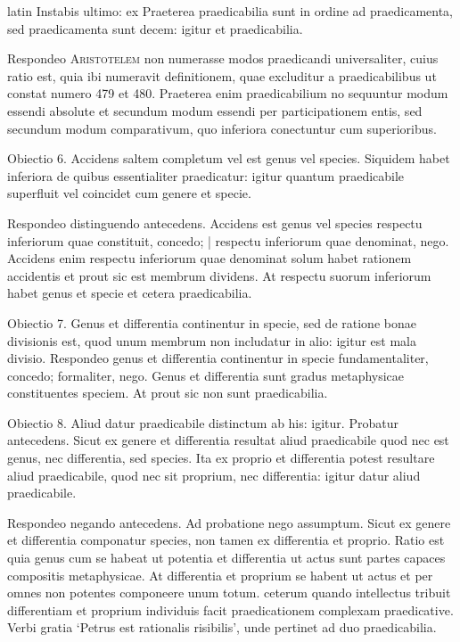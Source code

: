 \begin{otherlanguage*}{latin}
\pstart
Instabis ultimo:
ex  Praeterea praedicabilia sunt in ordine ad praedicamenta, sed praedicamenta sunt decem:
igitur et praedicabilia. 
\pend

\pstart
Respondeo \textsc{Aristotelem} non numerasse modos praedicandi universaliter, cuius ratio est, quia ibi numeravit definitionem, quae excluditur a praedicabilibus ut constat numero 479 et 480. Praeterea enim praedicabilium no sequuntur modum essendi absolute et secundum modum essendi per participationem entis, sed secundum modum comparativum, quo inferiora conectuntur cum superioribus. 
\pend

\pstart
Obiectio 6. Accidens saltem completum vel est genus vel species. Siquidem habet inferiora de quibus essentialiter praedicatur:
igitur quantum praedicabile superfluit vel coincidet cum genere et specie. 
\pend

\pstart
Respondeo distinguendo antecedens. Accidens est genus vel species respectu inferiorum quae constituit, concedo; \textnormal{|} respectu inferiorum quae denominat, nego. Accidens enim respectu inferiorum quae denominat solum habet rationem accidentis et prout sic est membrum dividens. At respectu suorum inferiorum habet genus et specie et cetera praedicabilia. 
\pend

\pstart
Obiectio 7. Genus et differentia continentur in specie, sed de ratione bonae divisionis est, quod unum membrum non includatur in alio:
igitur est mala divisio. Respondeo genus et differentia continentur in specie fundamentaliter, concedo; formaliter, nego. Genus et differentia sunt gradus metaphysicae constituentes speciem. At prout sic non sunt praedicabilia. 
\pend

\pstart
Obiectio 8. Aliud datur praedicabile distinctum ab his:
igitur. Probatur antecedens. Sicut ex genere et differentia resultat aliud praedicabile quod nec est genus, nec differentia, sed species. Ita ex proprio et differentia potest resultare aliud praedicabile, quod nec sit proprium, nec differentia:
igitur datur aliud praedicabile. 
\pend

\pstart
Respondeo negando antecedens. Ad probatione nego assumptum. Sicut ex genere et differentia componatur species, non tamen ex differentia et proprio. Ratio est quia genus cum se habeat ut potentia et differentia ut actus sunt partes capaces compositis metaphysicae. At differentia et proprium se habent ut actus et per omnes non potentes componeere unum totum. ceterum quando intellectus tribuit differentiam et proprium individuis facit praedicationem complexam praedicative. Verbi gratia `Petrus est rationalis risibilis', unde pertinet ad duo praedicabilia. 
\pend


\end{otherlanguage*}
